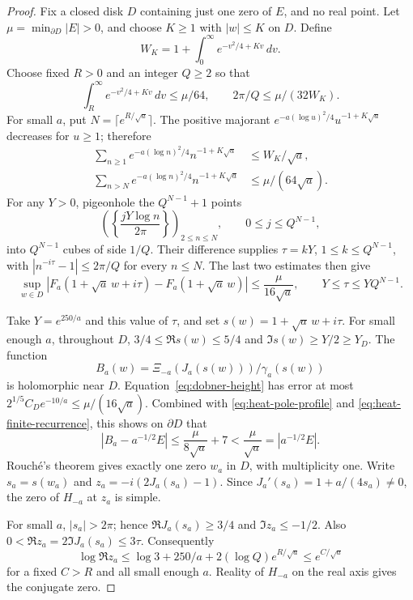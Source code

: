 \begin{proof}
Fix a closed disk $D$ containing just one zero of $E$, and no real
point. Let $\mu=\min_{\partial D}|E|>0$, and choose $K\ge1$ with
$|w|\le K$ on $D$. Define
\[
 W_K=1+\int_0^\infty e^{-v^2/4+Kv}\,dv.
\]
Choose fixed $R>0$ and an integer $Q\ge2$ so that
\[
 \int_R^\infty e^{-v^2/4+Kv}\,dv\le\mu/64,
 \qquad 2\pi/Q\le\mu/(32W_K).
\]
For small $a$, put $N=\lceil e^{R/\sqrt a}\rceil$. The positive
majorant $e^{-a(\log u)^2/4}u^{-1+K\sqrt a}$ decreases for $u\ge1$;
therefore
\begin{align*}
 \sum_{n\ge1}e^{-a(\log n)^2/4}n^{-1+K\sqrt a}&\le W_K/\sqrt a,\\
 \sum_{n>N}e^{-a(\log n)^2/4}n^{-1+K\sqrt a}&\le\mu/(64\sqrt a).
\end{align*}
For any $Y>0$, pigeonhole the $Q^{N-1}+1$ points
\[
 \left(\left\{\frac{jY\log n}{2\pi}\right\}\right)_{2\le n\le N},
 \qquad 0\le j\le Q^{N-1},
\]
into $Q^{N-1}$ cubes of side $1/Q$. Their difference supplies
$\tau=kY$, $1\le k\le Q^{N-1}$, with
$|n^{-i\tau}-1|\le2\pi/Q$ for every $n\le N$. The last two estimates
then give
\begin{equation}\label{eq:heat-finite-recurrence}
 \sup_{w\in D}|F_a(1+\sqrt a\,w+i\tau)-F_a(1+\sqrt a\,w)|
 \le\frac{\mu}{16\sqrt a},\qquad
 Y\le\tau\le YQ^{N-1}.
\end{equation}

Take $Y=e^{250/a}$ and this value of $\tau$, and set
$s(w)=1+\sqrt a\,w+i\tau$. For small enough $a$, throughout $D$,
$3/4\le\Re s(w)\le5/4$ and $\Im s(w)\ge Y/2\ge Y_D$.
The function
\[
 B_a(w)=\Xi_{-a}(J_a(s(w)))/\gamma_a(s(w))
\]
is holomorphic near $D$. Equation~\eqref{eq:dobner-height} has error
at most $2^{1/5}C_De^{-10/a}\le\mu/(16\sqrt a)$. Combined with
\eqref{eq:heat-pole-profile} and \eqref{eq:heat-finite-recurrence}, this
shows on $\partial D$ that
\[
 |B_a-a^{-1/2}E|\le\frac{\mu}{8\sqrt a}+7
 <\frac{\mu}{\sqrt a}=|a^{-1/2}E|.
\]
Rouch\'e's theorem gives exactly one zero $w_a$ in $D$, with
multiplicity one. Write $s_a=s(w_a)$ and
$z_a=-i(2J_a(s_a)-1)$. Since $J_a'(s_a)=1+a/(4s_a)\ne0$,
the zero of $H_{-a}$ at $z_a$ is simple.

For small $a$, $|s_a|>2\pi$; hence
$\Re J_a(s_a)\ge3/4$ and $\Im z_a\le-1/2$.
Also $0<\Re z_a=2\Im J_a(s_a)\le3\tau$. Consequently
\[
 \log\Re z_a\le\log3+250/a+2(\log Q)e^{R/\sqrt a}
 \le e^{C/\sqrt a}
\]
for a fixed $C>R$ and all small enough $a$. Reality of $H_{-a}$ on
the real axis gives the conjugate zero.
\end{proof}
